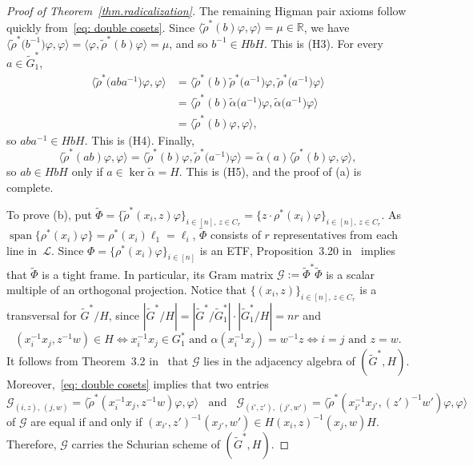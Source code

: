 \begin{proof}[Proof of Theorem~\ref{thm.radicalization}]
The remaining Higman pair axioms follow quickly from~\eqref{eq: double cosets}.
Since $\langle \tilde{\rho}^*(b) \varphi, \varphi \rangle = \mu \in \mathbb{R}$, we have $\bigl\langle \tilde{\rho}^*\bigl(b^{-1}\bigr) \varphi, \varphi \bigr\rangle = \langle  \varphi, \tilde{\rho}^*(b) \varphi \rangle = \mu$, and so $b^{-1} \in HbH$.
This is (H3).
For every $a \in \widetilde{G}_1^*$, 
\begin{align*}
\bigl\langle \tilde{\rho}^*\bigl(aba^{-1}\bigr) \varphi, \varphi \bigr\rangle 
&= \bigl\langle \tilde{\rho}^*(b) \tilde{\rho}^*\bigl(a^{-1}\bigr) \varphi, \tilde{\rho}^*\bigl(a^{-1}\bigr)\varphi \bigr\rangle \\
&= \bigl\langle \tilde{\rho}^*(b) \widetilde{\alpha}\bigl(a^{-1}\bigr) \varphi, \widetilde{\alpha}\bigl(a^{-1}\bigr)\varphi \bigr\rangle \\
&= \langle \tilde{\rho}^*(b) \varphi, \varphi \rangle,
\end{align*}
so $aba^{-1} \in HbH$.
This is (H4).
Finally, 
\[ 
\langle \tilde{\rho}^*(ab) \varphi, \varphi \rangle 
= \bigl\langle \tilde{\rho}^*(b) \varphi, \tilde{\rho}^*\bigl(a^{-1}\bigr) \varphi \bigr\rangle 
= \widetilde{\alpha}(a) \langle \tilde{\rho}^*(b) \varphi, \varphi \rangle,
\]
so $ab \in HbH$ only if $a \in \ker \widetilde{\alpha} = H$.
This is (H5), and the proof of (a) is complete.

To prove (b), put $\widetilde{\Phi} = \{ \tilde{\rho}^*(x_i, z) \varphi \}_{i \in [n],\, z \in C_r} = \{ z\cdot \rho^*(x_i) \varphi \}_{i\in [n],\, z \in C_r}$.
As $\operatorname{span}\{ \rho^*(x_i) \varphi \} = \rho^*(x_i) \ell_1 = \ell_i$, $\widetilde{\Phi}$ consists of $r$ representatives from each line in~$\mathscr{L}$.
Since $\Phi = \{ \rho^*(x_i) \varphi \}_{i \in [n]}$ is an ETF, Proposition~3.20 in~\cite{IversonJM:17} implies that $\widetilde{\Phi}$ is a tight frame.
In particular, its Gram matrix $\mathcal{G} := \widetilde{\Phi}^* \widetilde{\Phi}$ is a scalar multiple of an orthogonal projection.
Notice that $\{ (x_i, z) \}_{i \in [n],\, z \in C_r}$ is a transversal for $\widetilde{G}^*/H$, since $|\widetilde{G}^*/H| = |\widetilde{G}^*/\widetilde{G}_1^*|\cdot |\widetilde{G}_1^*/H| = nr$ and 
\[ (x_i^{-1} x_j, z^{-1} w) \in H \iff x_i^{-1} x_j \in G_1^*\text{ and } \alpha(x_i^{-1} x_j) = w^{-1} z \iff i=j \text{ and } z=w. \]
It follows from Theorem~3.2 in~\cite{IversonJM:17} that $\mathcal{G}$ lies in the adjacency algebra of $(\widetilde{G}^*,H)$.
Moreover,~\eqref{eq: double cosets} implies that two entries
\[ \mathcal{G}_{(i,z),\, (j,w)} = \langle \tilde{\rho}^*(x_i^{-1} x_j, z^{-1} w) \varphi, \varphi \rangle \:\:\:\: \text{and} \:\:\:\: \mathcal{G}_{(i',z'),\, (j',w')} = \langle \tilde{\rho}^*(x_{i'}^{-1} x_{j'}, (z')^{-1} {w'}) \varphi, \varphi \rangle \]
of $\mathcal{G}$ are equal if and only if $(x_{i'},z')^{-1} (x_{j'},w') \in H(x_i,z)^{-1} (x_j,w) H$.
Therefore, $\mathcal{G}$ carries the Schurian scheme of $(\widetilde{G}^*,H)$.


\end{proof}
